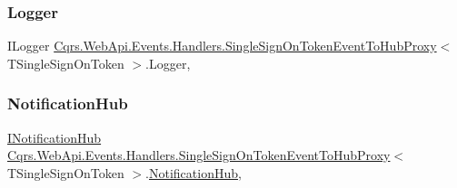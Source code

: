 \subsubsection{\texorpdfstring{Logger}{Logger}}
{\footnotesize\ttfamily I\+Logger \hyperlink{classCqrs_1_1WebApi_1_1Events_1_1Handlers_1_1SingleSignOnTokenEventToHubProxy}{Cqrs.\+Web\+Api.\+Events.\+Handlers.\+Single\+Sign\+On\+Token\+Event\+To\+Hub\+Proxy}$<$ T\+Single\+Sign\+On\+Token $>$.Logger\hspace{0.3cm}{\ttfamily [get]}, {\ttfamily [protected]}}

\mbox{\label{classCqrs_1_1WebApi_1_1Events_1_1Handlers_1_1SingleSignOnTokenEventToHubProxy_a9621749560e567a6252f3d7e2328174d_a9621749560e567a6252f3d7e2328174d}} 
\subsubsection{\texorpdfstring{Notification\+Hub}{NotificationHub}}
{\footnotesize\ttfamily \hyperlink{interfaceCqrs_1_1WebApi_1_1SignalR_1_1Hubs_1_1INotificationHub}{I\+Notification\+Hub} \hyperlink{classCqrs_1_1WebApi_1_1Events_1_1Handlers_1_1SingleSignOnTokenEventToHubProxy}{Cqrs.\+Web\+Api.\+Events.\+Handlers.\+Single\+Sign\+On\+Token\+Event\+To\+Hub\+Proxy}$<$ T\+Single\+Sign\+On\+Token $>$.\hyperlink{classCqrs_1_1WebApi_1_1SignalR_1_1Hubs_1_1NotificationHub}{Notification\+Hub}\hspace{0.3cm}{\ttfamily [get]}, {\ttfamily [protected]}}

